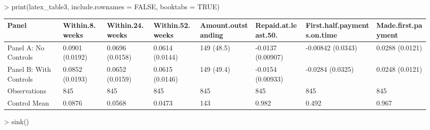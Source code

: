 
> print(latex_table3, include.rownames = FALSE, booktabs = TRUE)
\begin{table}[ht]
\centering
\begin{tabular}{llllllll}
  \toprule
Panel & Within.8.weeks & Within.24.weeks & Within.52.weeks & Amount.outstanding & Repaid.at.least.50. & First.half.payments.on.time & Made.first.payment \\ 
  \midrule
Panel A: No Controls & 0.0901 (0.0192) & 0.0696 (0.0158) & 0.0614 (0.0144) & 149 (48.5) & -0.0137 (0.00907) & -0.00842 (0.0343) & 0.0288 (0.0121) \\ 
  Panel B: With Controls & 0.0852 (0.0193) & 0.0652 (0.0159) & 0.0615 (0.0146) & 149 (49.4) & -0.0154 (0.00933) & -0.0284 (0.0325) & 0.0248 (0.0121) \\ 
  Observations & 845 & 845 & 845 & 845 & 845 & 845 & 845 \\ 
  Control Mean & 0.0876 & 0.0568 & 0.0473 & 143 & 0.982 & 0.492 & 0.967 \\ 
   \bottomrule
\end{tabular}
\end{table}

> sink()
